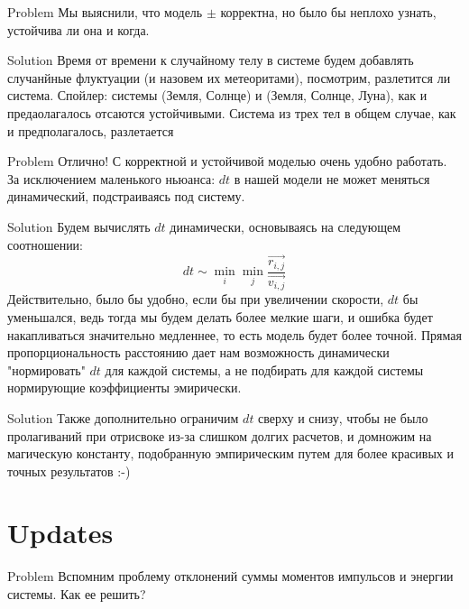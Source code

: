 \documentclass{beamer}
\begin{document}
\begin{frame}[fragile]{Problem}
  Мы выяснили, что модель $\pm$ корректна, но было бы неплохо узнать, устойчива ли она и когда.
\end{frame}

\begin{frame}[fragile]{Solution}
  Время от времени к случайному телу в системе будем добавлять случанйные флуктуации
  (и назовем их метеоритами), посмотрим, разлетится ли система.\newline
  Спойлер: системы (Земля, Солнце) и (Земля, Солнце, Луна), как и предаолагалось отсаются устойчивыми.
  Система из трех тел в общем случае, как и предполагалось, разлетается
\end{frame}

\begin{frame}[fragile]{Problem}
  Отлично! С корректной и устойчивой моделью очень удобно работать. За исключением маленького ньюанса:
  $dt$ в нашей модели не может меняться динамический, подстраиваясь под систему.
\end{frame}

\begin{frame}[fragile]{Solution}
  Будем вычислять $dt$ динамически, основываясь на следующем соотношении:
  \[dt \sim \min_i \min_j \dfrac{\overrightarrow{r_{i,j}}}{\overrightarrow{v_{i,j}}}\]
  Действительно, было бы удобно, если бы при увеличении скорости, $dt$ бы уменьшался,
  ведь тогда мы будем делать более мелкие шаги, и ошибка будет накапливаться значительно медленнее,
  то есть модель будет более точной.\newline
  Прямая пропорциональность расстоянию дает нам возможность динамически "нормировать" $dt$ для каждой системы,
  а не подбирать для каждой системы нормирующие коэффициенты эмирически.
\end{frame}

\begin{frame}[fragile]{Solution}
  Также дополнительно ограничим $dt$ сверху и снизу, чтобы не было пролагиваний при отрисвоке
  из-за слишком долгих расчетов, и домножим на магическую константу, подобранную эмпирическим
  путем для более красивых и точных результатов :-)
\end{frame}

\section{Updates}

\begin{frame}[fragile]{Problem}
  Вспомним проблему отклонений суммы моментов импульсов и энергии системы. Как ее решить?
\end{frame}
\end{document}
